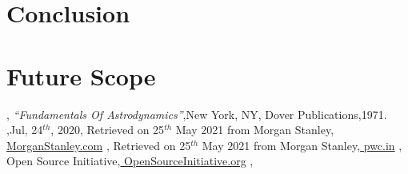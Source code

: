 \documentclass[12pt]{article}
\begin{document}
\section{Conclusion}
\section{Future Scope}

\begin{thebibliography}{99}
	,{ \textit{\enquote{Fundamentals Of Astrodynamics}}},{New York, NY},{ Dover Publications},{1971}.
	,{Jul, 24$^{th}$, 2020}, { Retrieved on 25$^{th}$ May 2021 from Morgan Stanley},{\href{https://www.morganstanley.com/ideas/investing-in-space}{ MorganStanley.com}}
	,{ Retrieved on 25$^{th}$ May 2021 from Morgan Stanley},{\href{https://www.pwc.in/research-insights/2020/preparing-to-scale-new-heights.html}{ pwc.in}}
	,{ Open Source Initiative},{\href{https://opensource.org/licenses/gpl-3.0.html}{ OpenSourceInitiative.org}}
	, {}
	

\end{thebibliography}
\end{document}
